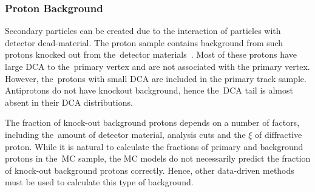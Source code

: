 \subsubsection{Proton Background}\label{section:star_background_proton}
Secondary particles can be created due to the interaction of particles with detector dead-material.
The proton sample contains background from such protons knocked out  from the~detector materials~\cite{STAR:spectra}. Most of these protons have large $\textrm{DCA}$ to the~primary vertex and are not associated with the primary vertex. However, the~protons with small $\textrm{DCA}$  are included in the primary track sample. Antiprotons do not have knockout background, hence the~$\textrm{DCA}$ tail is almost absent in their $\textrm{DCA}$ distributions.

The fraction of knock-out background protons depends on a number of factors, including the~amount of detector material, analysis cuts and the $\xi$ of diffractive proton. While it is natural to calculate the fractions of primary and background protons in the~\ac{MC} sample, the \ac{MC} models do not necessarily predict the fraction of knock-out background protons correctly. Hence, other data-driven methods must be used to calculate this type of background.


